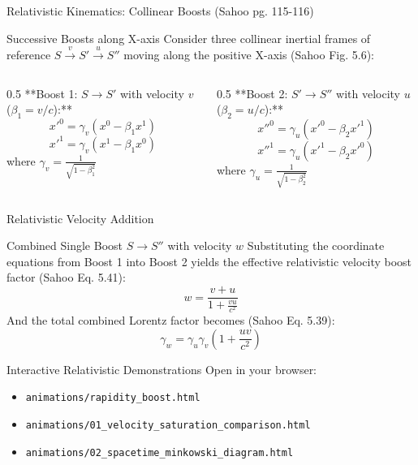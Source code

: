 \documentclass[aspectratio=169]{beamer}
\begin{document}
\begin{frame}{Relativistic Kinematics: Collinear Boosts (Sahoo pg. 115-116)}
    \begin{block}{Successive Boosts along X-axis}
        Consider three collinear inertial frames of reference $S \xrightarrow{v} S' \xrightarrow{u} S''$ moving along the positive X-axis (Sahoo Fig. 5.6):
    \end{block}
    \begin{columns}
        \begin{column}{0.5\textwidth}
            \footnotesize
            **Boost 1: $S \rightarrow S'$ with velocity $v$ ($\beta_1 = v/c$):**
            \[ x'^{0} = \gamma_v (x^0 - \beta_1 x^1) \]
            \[ x'^{1} = \gamma_v (x^1 - \beta_1 x^0) \]
            where $\gamma_v = \frac{1}{\sqrt{1 - \beta_1^2}}$
        \end{column}
        \begin{column}{0.5\textwidth}
            \footnotesize
            **Boost 2: $S' \rightarrow S''$ with velocity $u$ ($\beta_2 = u/c$):**
            \[ x''^{0} = \gamma_u (x'^{0} - \beta_2 x'^{1}) \]
            \[ x''^{1} = \gamma_u (x'^{1} - \beta_2 x'^{0}) \]
            where $\gamma_u = \frac{1}{\sqrt{1 - \beta_2^2}}$
        \end{column}
    \end{columns}
\end{frame}

\begin{frame}{Relativistic Velocity Addition}
    \begin{block}{Combined Single Boost $S \rightarrow S''$ with velocity $w$}
        Substituting the coordinate equations from Boost 1 into Boost 2 yields the effective relativistic velocity boost factor (Sahoo Eq. 5.41):
        \[ w = \frac{v + u}{1 + \frac{vu}{c^2}} \]
        And the total combined Lorentz factor becomes (Sahoo Eq. 5.39):
        \[ \gamma_w = \gamma_u \gamma_v \left( 1 + \frac{uv}{c^2} \right) \]
    \end{block}
    \begin{alertblock}{Interactive Relativistic Demonstrations}
        Open in your browser:
        \begin{itemize}
            \item \texttt{animations/rapidity\_boost.html} 
            \item \texttt{animations/01\_velocity\_saturation\_comparison.html} 
            \item \texttt{animations/02\_spacetime\_minkowski\_diagram.html} 
        \end{itemize}
    \end{alertblock}
\end{frame}
\end{document}

